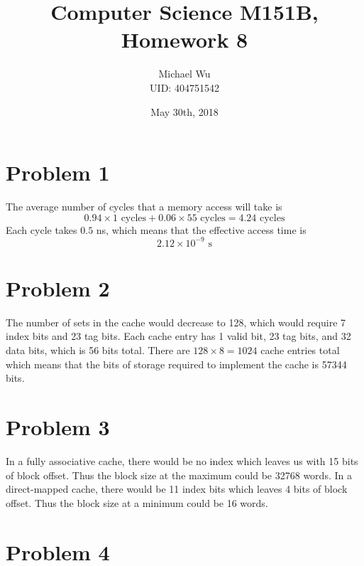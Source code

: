 \documentclass[12pt]{article}
\begin{document}
\title{Computer Science M151B, Homework 8}
\date{May 30th, 2018}
\author{Michael Wu\\UID: 404751542}
\maketitle

\section*{Problem 1}

The average number of cycles that a memory access will take is
\[0.94\times 1\text{ cycles} + 0.06\times 55\text{ cycles} = 4.24 \text{ cycles}\]
Each cycle takes \(0.5\) ns, which means that the effective access time is
\[2.12\times 10^{-9} \text{ s}\]

\section*{Problem 2}

The number of sets in the cache would decrease to 128, which would require 7 index bits and 23 tag bits.
Each cache entry has 1 valid bit, 23 tag bits, and 32 data bits, which is 56 bits total. There are \(128\times 8=1024\)
cache entries total which means that the bits of storage required to implement the cache is 57344 bits.

\section*{Problem 3}

In a fully associative cache, there would be no index which leaves us with 15 bits of block offset. Thus the block size at the maximum could
be 32768 words. In a direct-mapped cache, there would be 11 index bits which leaves 4 bits of block offset. Thus the block size at a minimum
could be 16 words.

\section*{Problem 4}
\end{document}
